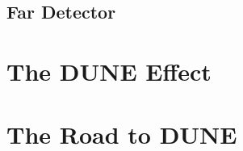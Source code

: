 \subsection{Far Detector}\label{sec:FarDetector}

\section{The DUNE Effect}\label{sec:DUNEEffect}

\section{The Road to DUNE}\label{sec:RoadToDUNE}
